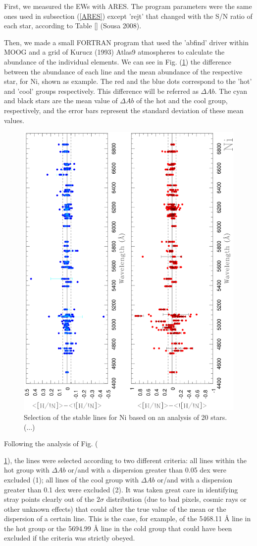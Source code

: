 \documentclass[dvips,12pt,a4paper]{report}
\begin{document}
{First, we measured the EWs with ARES. The program parameters were the same ones used in subsection (\ref{ARES}) except 'rejt' that changed with the S/N ratio of each star, according to Table \ref{} (Sousa 2008). 

Then, we made a small FORTRAN program that used the 'abfind' driver within MOOG and a grid of Kurucz (1993) Atlas9 atmospheres to calculate the abundance of the individual elements. We can see in Fig. (\ref{Ni20}) the difference between the abundance of each line and the mean abundance of the respective star, for Ni, shown as example. The red and the blue dots correspond to the 'hot' and 'cool' groups respectively. This difference will be referred as $\Delta Ab$. The cyan and black stars are the mean value of $\Delta Ab$ of the hot and the cool group, respectively, and the error bars represent the standard deviation of these mean values. 

\begin{figure}[h]
\centering
\includegraphics[width=10 cm]{pics/Ni20.eps}
\caption[20 star delta ab graphics]{Selection of the stable lines for Ni based on an analysis of 20 stars. (...)}
\label{Ni20}
\end{figure}

Following the analysis of Fig. ({\ref{Ni20}), the lines were selected according to two different criteria: all lines within the hot group with $\Delta Ab$ or/and with a dispersion greater than 0.05 dex were excluded (1); all lines of the cool group with $\Delta Ab$ or/and  with a dispersion greater than 0.1 dex were excluded (2). It was taken great care in identifying stray points clearly out of the $2\sigma$ distribution (due to bad pixels, cosmic rays or other unknown effects) that could alter the true value of the mean or the dispersion of a certain line. This is the case, for example, of the 5468.11 \AA{} line in the hot group or the 5694.99 \AA{} line in the cold group that could have been excluded if the criteria was strictly obeyed. 

}}
\end{document}
